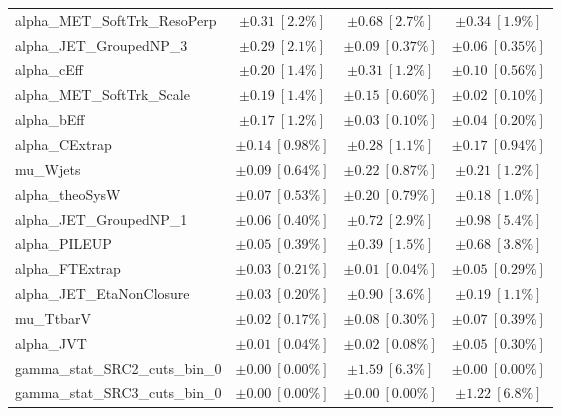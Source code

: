 \begin{table}
\begin{center}
\begin{tabular*}{\textwidth}{@{\extracolsep{\fill}}lccc}
alpha\_MET\_SoftTrk\_ResoPerp         & $\pm 0.31\ [2.2\%] $          & $\pm 0.68\ [2.7\%] $          & $\pm 0.34\ [1.9\%] $       \\
alpha\_JET\_GroupedNP\_3         & $\pm 0.29\ [2.1\%] $          & $\pm 0.09\ [0.37\%] $          & $\pm 0.06\ [0.35\%] $       \\
alpha\_cEff         & $\pm 0.20\ [1.4\%] $          & $\pm 0.31\ [1.2\%] $          & $\pm 0.10\ [0.56\%] $       \\
alpha\_MET\_SoftTrk\_Scale         & $\pm 0.19\ [1.4\%] $          & $\pm 0.15\ [0.60\%] $          & $\pm 0.02\ [0.10\%] $       \\
alpha\_bEff         & $\pm 0.17\ [1.2\%] $          & $\pm 0.03\ [0.10\%] $          & $\pm 0.04\ [0.20\%] $       \\
alpha\_CExtrap         & $\pm 0.14\ [0.98\%] $          & $\pm 0.28\ [1.1\%] $          & $\pm 0.17\ [0.94\%] $       \\
mu\_Wjets         & $\pm 0.09\ [0.64\%] $          & $\pm 0.22\ [0.87\%] $          & $\pm 0.21\ [1.2\%] $       \\
alpha\_theoSysW         & $\pm 0.07\ [0.53\%] $          & $\pm 0.20\ [0.79\%] $          & $\pm 0.18\ [1.0\%] $       \\
alpha\_JET\_GroupedNP\_1         & $\pm 0.06\ [0.40\%] $          & $\pm 0.72\ [2.9\%] $          & $\pm 0.98\ [5.4\%] $       \\
alpha\_PILEUP         & $\pm 0.05\ [0.39\%] $          & $\pm 0.39\ [1.5\%] $          & $\pm 0.68\ [3.8\%] $       \\
alpha\_FTExtrap         & $\pm 0.03\ [0.21\%] $          & $\pm 0.01\ [0.04\%] $          & $\pm 0.05\ [0.29\%] $       \\
alpha\_JET\_EtaNonClosure         & $\pm 0.03\ [0.20\%] $          & $\pm 0.90\ [3.6\%] $          & $\pm 0.19\ [1.1\%] $       \\
mu\_TtbarV         & $\pm 0.02\ [0.17\%] $          & $\pm 0.08\ [0.30\%] $          & $\pm 0.07\ [0.39\%] $       \\
alpha\_JVT         & $\pm 0.01\ [0.04\%] $          & $\pm 0.02\ [0.08\%] $          & $\pm 0.05\ [0.30\%] $       \\
gamma\_stat\_SRC2\_cuts\_bin\_0         & $\pm 0.00\ [0.00\%] $          & $\pm 1.59\ [6.3\%] $          & $\pm 0.00\ [0.00\%] $       \\
gamma\_stat\_SRC3\_cuts\_bin\_0         & $\pm 0.00\ [0.00\%] $          & $\pm 0.00\ [0.00\%] $          & $\pm 1.22\ [6.8\%] $       \\

\end{tabular*}
\end{center}
\end{table}
